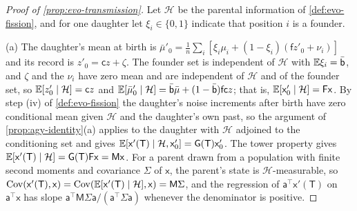 \begin{proof}[Proof of \cref{prop:evo-transmission}]
Let $\mathcal H$ be the parental information of \cref{def:evo-fission}, and for one daughter let $\xi_i\in\{0,1\}$ indicate that position $i$ is a founder.

(a) The daughter's mean at birth is $\bar\mu'_0=\frac1n\sum_i[\xi_i\mu_i+(1-\xi_i)(\mathsf f z'_0+\nu_i)]$ and its record is $z'_0=\mathsf cz+\zeta$. The founder set is independent of $\mathcal H$ with $\mathbb{E}\xi_i=\bar{\mathsf b}$, and $\zeta$ and the $\nu_i$ have zero mean and are independent of $\mathcal H$ and of the founder set, so $\mathbb{E}[z'_0\mid\mathcal H]=\mathsf cz$ and $\mathbb{E}[\bar\mu'_0\mid\mathcal H]=\bar{\mathsf b}\bar\mu+(1-\bar{\mathsf b})\mathsf f\mathsf cz$; that is, $\mathbb{E}[\mathsf x'_0\mid\mathcal H]=\mathsf F\mathsf x$. By step (iv) of \cref{def:evo-fission} the daughter's noise increments after birth have zero conditional mean given $\mathcal H$ and the daughter's own past, so the argument of \cref{prop:agy-identity}(a) applies to the daughter with $\mathcal H$ adjoined to the conditioning set and gives $\mathbb{E}[\mathsf x'(\mathsf T)\mid\mathcal H,\mathsf x'_0]=\mathsf G(\mathsf T)\mathsf x'_0$. The tower property gives $\mathbb{E}[\mathsf x'(\mathsf T)\mid\mathcal H]=\mathsf G(\mathsf T)\mathsf F\mathsf x=\mathsf M\mathsf x$. For a parent drawn from a population with finite second moments and covariance $\Sigma$ of $\mathsf x$, the parent's state is $\mathcal H$-measurable, so $\operatorname{Cov}(\mathsf x'(\mathsf T),\mathsf x)=\operatorname{Cov}(\mathbb{E}[\mathsf x'(\mathsf T)\mid\mathcal H],\mathsf x)=\mathsf M\Sigma$, and the regression of $\mathsf a^\top\mathsf x'(\mathsf T)$ on $\mathsf a^\top\mathsf x$ has slope $\mathsf a^\top\mathsf M\Sigma\mathsf a/(\mathsf a^\top\Sigma\mathsf a)$ whenever the denominator is positive.


\end{proof}
